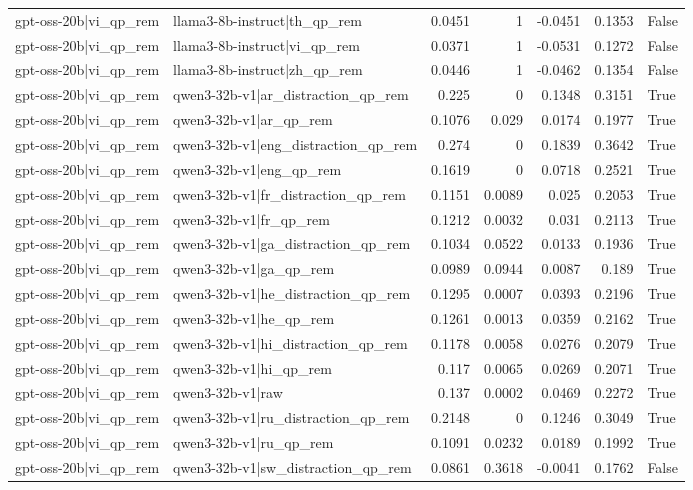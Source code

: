 \begin{table}
\begin{tabular}{l l r r r r l}
gpt-oss-20b|vi_qp_rem & llama3-8b-instruct|th_qp_rem & 0.0451 & 1 & -0.0451 & 0.1353 & False \\
gpt-oss-20b|vi_qp_rem & llama3-8b-instruct|vi_qp_rem & 0.0371 & 1 & -0.0531 & 0.1272 & False \\
gpt-oss-20b|vi_qp_rem & llama3-8b-instruct|zh_qp_rem & 0.0446 & 1 & -0.0462 & 0.1354 & False \\
gpt-oss-20b|vi_qp_rem & qwen3-32b-v1|ar_distraction_qp_rem & 0.225 & 0 & 0.1348 & 0.3151 & True \\
gpt-oss-20b|vi_qp_rem & qwen3-32b-v1|ar_qp_rem & 0.1076 & 0.029 & 0.0174 & 0.1977 & True \\
gpt-oss-20b|vi_qp_rem & qwen3-32b-v1|eng_distraction_qp_rem & 0.274 & 0 & 0.1839 & 0.3642 & True \\
gpt-oss-20b|vi_qp_rem & qwen3-32b-v1|eng_qp_rem & 0.1619 & 0 & 0.0718 & 0.2521 & True \\
gpt-oss-20b|vi_qp_rem & qwen3-32b-v1|fr_distraction_qp_rem & 0.1151 & 0.0089 & 0.025 & 0.2053 & True \\
gpt-oss-20b|vi_qp_rem & qwen3-32b-v1|fr_qp_rem & 0.1212 & 0.0032 & 0.031 & 0.2113 & True \\
gpt-oss-20b|vi_qp_rem & qwen3-32b-v1|ga_distraction_qp_rem & 0.1034 & 0.0522 & 0.0133 & 0.1936 & True \\
gpt-oss-20b|vi_qp_rem & qwen3-32b-v1|ga_qp_rem & 0.0989 & 0.0944 & 0.0087 & 0.189 & True \\
gpt-oss-20b|vi_qp_rem & qwen3-32b-v1|he_distraction_qp_rem & 0.1295 & 0.0007 & 0.0393 & 0.2196 & True \\
gpt-oss-20b|vi_qp_rem & qwen3-32b-v1|he_qp_rem & 0.1261 & 0.0013 & 0.0359 & 0.2162 & True \\
gpt-oss-20b|vi_qp_rem & qwen3-32b-v1|hi_distraction_qp_rem & 0.1178 & 0.0058 & 0.0276 & 0.2079 & True \\
gpt-oss-20b|vi_qp_rem & qwen3-32b-v1|hi_qp_rem & 0.117 & 0.0065 & 0.0269 & 0.2071 & True \\
gpt-oss-20b|vi_qp_rem & qwen3-32b-v1|raw & 0.137 & 0.0002 & 0.0469 & 0.2272 & True \\
gpt-oss-20b|vi_qp_rem & qwen3-32b-v1|ru_distraction_qp_rem & 0.2148 & 0 & 0.1246 & 0.3049 & True \\
gpt-oss-20b|vi_qp_rem & qwen3-32b-v1|ru_qp_rem & 0.1091 & 0.0232 & 0.0189 & 0.1992 & True \\
gpt-oss-20b|vi_qp_rem & qwen3-32b-v1|sw_distraction_qp_rem & 0.0861 & 0.3618 & -0.0041 & 0.1762 & False \\

\end{tabular}
\end{table}
